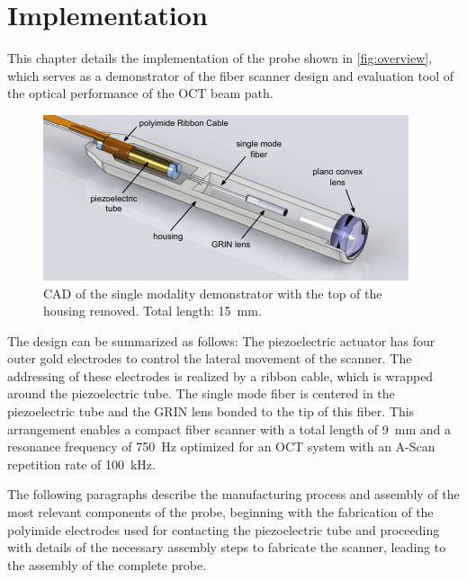 %
\chapter{Implementation}
\label{Ch:Fab}	

This chapter details the implementation of the probe shown in \autoref{fig:overview}, which serves as a demonstrator of the fiber scanner design and evaluation tool of the optical performance of the OCT beam path.

\begin{figure}[h!]\centering 
\includegraphics[width=\columnwidth]{figures/40_Fabrication/overview.pdf}
      \caption{CAD of the single modality demonstrator with the top of the housing removed. Total length: \SI{15}{\milli\meter}.}
      \label{fig:overview}
\end{figure}

The design can be summarized as follows: The piezoelectric actuator has four outer gold electrodes to control the lateral movement of the scanner. The addressing of these electrodes is realized by a ribbon cable, which is wrapped around the piezoelectric tube. The single mode fiber is centered in the piezoelectric tube and the GRIN lens bonded to the tip of this fiber. This arrangement enables a compact fiber scanner with a total length of \SI{9}{\milli\meter} and a resonance frequency of \SI{750}{\hertz} optimized for an OCT system with an A-Scan repetition rate of \SI{100}{\kilo\hertz}.

The following paragraphs describe the manufacturing process and assembly of the most relevant components of the probe, beginning with the fabrication of the polyimide electrodes used for contacting the piezoelectric tube and proceeding with details of the necessary assembly steps to fabricate the scanner, leading to the assembly of the complete probe.


